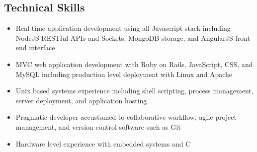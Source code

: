\documentclass[12pt,letterpaper]{article}
\begin{document}








\subsection*{Technical Skills}

\begin{itemize}

  \item Real-time application development using all Javascript stack including
  NodeJS RESTful APIs and Sockets, MongoDB storage, and AngularJS front-end
  interface

  \item MVC web application development with Ruby on Rails, JavaScript, CSS, and
  MySQL including production level deployment with Linux and Apache

  \item Unix based systems experience including shell scripting, process management,
  server deployment, and application hosting

  \item Pragmatic developer accustomed to collaborative workflow,
  agile project management, and version control software such as Git

  \item Hardware level experience with embedded systems and C

\end{itemize}
\end{document}
